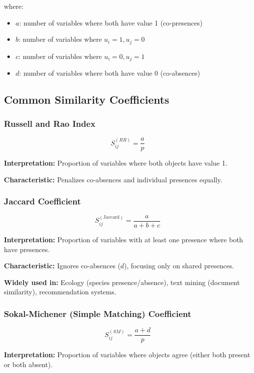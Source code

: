 \documentclass[11pt]{article}
\begin{document}
where:
\begin{itemize}
    \item $a$: number of variables where both have value 1 (co-presences)
    \item $b$: number of variables where $u_i = 1, u_j = 0$
    \item $c$: number of variables where $u_i = 0, u_j = 1$
    \item $d$: number of variables where both have value 0 (co-absences)
\end{itemize}

\subsection{Common Similarity Coefficients}

\subsubsection{Russell and Rao Index}

$$S_{ij}^{(RR)} = \frac{a}{p}$$

\textbf{Interpretation:} Proportion of variables where both objects have value 1.

\textbf{Characteristic:} Penalizes co-absences and individual presences equally.

\subsubsection{Jaccard Coefficient}

$$S_{ij}^{(\text{Jaccard})} = \frac{a}{a + b + c}$$

\textbf{Interpretation:} Proportion of variables with at least one presence where both have presences.

\textbf{Characteristic:} Ignores co-absences ($d$), focusing only on shared presences.

\textbf{Widely used in:} Ecology (species presence/absence), text mining (document similarity), recommendation systems.

\subsubsection{Sokal-Michener (Simple Matching) Coefficient}

$$S_{ij}^{(SM)} = \frac{a + d}{p}$$

\textbf{Interpretation:} Proportion of variables where objects agree (either both present or both absent).
\end{document}
